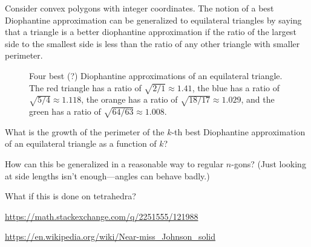 \documentclass{article}
\begin{document}
Consider convex polygons with integer coordinates. The notion of a best
Diophantine approximation can be generalized to equilateral triangles by
saying that a triangle is a better diophantine approximation if
the ratio of the largest side to the smallest side is less than the ratio of
any other triangle with smaller perimeter.
\begin{figure}[ht!]
  \centering
  \caption{
    Four best (?) Diophantine approximations of an equilateral triangle.
    The red triangle has a ratio of $\sqrt{2/1} \approx 1.41$,
    the blue has a ratio of $\sqrt{5/4} \approx 1.118$,
    the orange has a ratio of $\sqrt{18/17} \approx 1.029$, and
    the green has a ratio of $\sqrt{64/63} \approx 1.008$.
  }
\end{figure}
\begin{question}
  What is the growth of the perimeter of the $k$-th best Diophantine
  approximation of an equilateral triangle as a function of $k$?
\end{question}

\begin{related}
  \item How can this be generalized in a reasonable way to regular $n$-gons?
    (Just looking at side lengths isn't enough---angles can behave badly.)
  \item What if this is done on tetrahedra?
\end{related}
\begin{references}
  \item \url{https://math.stackexchange.com/q/2251555/121988}
  \item \url{https://en.wikipedia.org/wiki/Near-miss_Johnson_solid}
\end{references}
\end{document}
